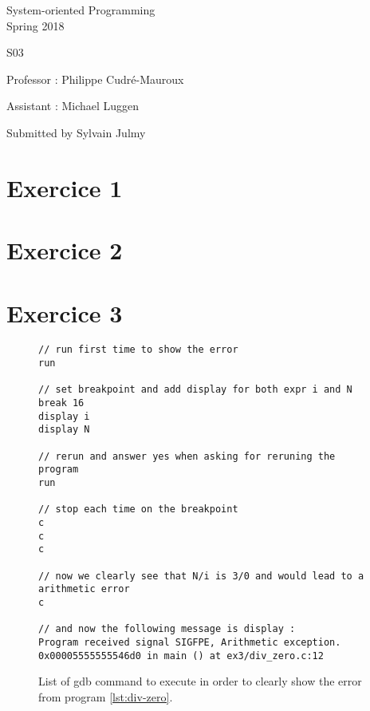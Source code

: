 \documentclass[a4paper,11pt]{report}
\author{Sylvain Julmy}
\date{\today}
\begin{document}
\begin{center}
  \Large{
    System-oriented Programming\\
    Spring 2018
  }
  
  \noindent\makebox[\linewidth]{\rule{\linewidth}{0.4pt}}
  S03
  \noindent\makebox[\linewidth]{\rule{\linewidth}{0.4pt}}

  \begin{flushleft}
    Professor : Philippe Cudré-Mauroux

    Assistant : Michael Luggen
  \end{flushleft}
  
  \noindent\makebox[\linewidth]{\rule{\linewidth}{0.4pt}}

  Submitted by Sylvain Julmy
  
  \noindent\makebox[\linewidth]{\rule{\textwidth}{1pt}}
\end{center}

\section*{Exercice 1}

\section*{Exercice 2}

\section*{Exercice 3}

\begin{figure}[ht]
  \centering
\begin{verbatim}
// run first time to show the error
run

// set breakpoint and add display for both expr i and N
break 16
display i
display N

// rerun and answer yes when asking for reruning the program
run

// stop each time on the breakpoint
c
c
c

// now we clearly see that N/i is 3/0 and would lead to a arithmetic error
c

// and now the following message is display :
Program received signal SIGFPE, Arithmetic exception.
0x00005555555546d0 in main () at ex3/div_zero.c:12
\end{verbatim}
  \caption{\label{fig:gdb-script} List of gdb command to execute in order to
    clearly show the error from program \ref{lst:div-zero}.}
\end{figure}
\end{document}
